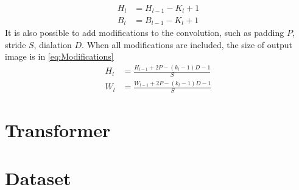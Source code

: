   \begin{equation}
  \begin{aligned}
    H_{l}&=H_{l-1}-K_{l}+1\\
    B_{l}&=B_{l-1}-K_{l}+1
      \label{eq:CNN size change}
  \end{aligned}
  \end{equation}
  It is also possible to add modifications to the convolution, such as padding $P$, stride $S$, dialation $D$. When all modifications are included, the size of output image is in \autoref{eq:Modifications} 
  \begin{equation}
  \begin{aligned}
    H_{l}&=\frac{H_{l-1}+2P-(k_{l}-1)D-1}{S}\\
    W_{l}&=\frac{W_{l-1}+2P-(k_{l}-1)D-1}{S}
      \label{eq:Modifications}
  \end{aligned}
  \end{equation}
\section{Transformer}
\section{Dataset}